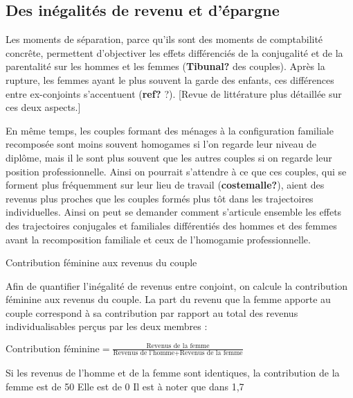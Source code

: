 \documentclass[
  12pt,
]{book}
\begin{document}
\subsection{Des inégalités de revenu et
d'épargne}\label{des-inuxe9galituxe9s-de-revenu-et-duxe9pargne}

Les moments de séparation, parce qu'ils sont des moments de comptabilité
concrête, permettent d'objectiver les effets différenciés de la
conjugalité et de la parentalité sur les hommes et les femmes
(\textbf{Tibunal?} des couples). Après la rupture, les femmes ayant le
plus souvent la garde des enfants, ces différences entre ex-conjoints
s'accentuent (\textbf{ref?} ?). {[}Revue de littérature plus détaillée
sur ces deux aspects.{]}

En même temps, les couples formant des ménages à la configuration
familiale recomposée sont moins souvent homogames si l'on regarde leur
niveau de diplôme, mais il le sont plus souvent que les autres couples
si on regarde leur position professionnelle. Ainsi on pourrait
s'attendre à ce que ces couples, qui se forment plus fréquemment sur
leur lieu de travail (\textbf{costemalle?}), aient des revenus plus
proches que les couples formés plus tôt dans les trajectoires
individuelles. Ainsi on peut se demander comment s'articule ensemble les
effets des trajectoires conjugales et familiales différentiés des hommes
et des femmes avant la recomposition familiale et ceux de l'homogamie
professionnelle.

\begin{encadre}{Contribution féminine aux revenus du couple}

Afin de quantifier l'inégalité de revenus entre conjoint, on calcule la contribution féminine aux revenus du couple. La part du revenu que la femme apporte au couple correspond à sa contribution par rapport au total des revenus individualisables perçus par les deux membres : 


$\text{Contribution féminine} = \frac{\text{Revenus de la femme}}{\text{Revenus de l'homme} + \text{Revenus de la femme}}$


Si les revenus de l'homme et de la femme sont identiques, la contribution de la femme est de 50 %
Elle est de 0 %
Il est à noter que dans 1,7 %

\end{encadre}
\end{document}
